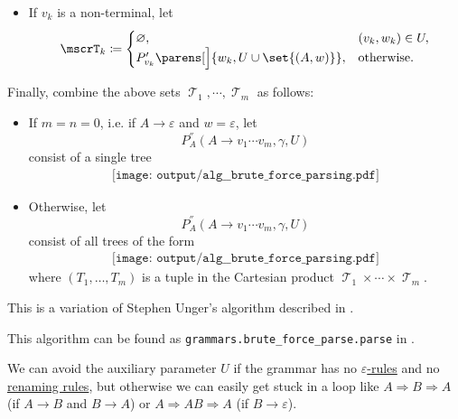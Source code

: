 \begin{algorithm}
\begin{thmenum}
\begin{itemize}
      \item If \( v_k \) is a non-terminal, let
      \begin{equation*}
        \mscrT_k \coloneqq \begin{cases}
          \varnothing,                                         &(v_k, w_k) \in U, \\
          P'_{v_k}\parens[\Big]{ w_k, U \cup \set{ (A, w) } }, &\T{otherwise.}
        \end{cases}
      \end{equation*}
    \end{itemize}

     Finally, combine the above sets \( \mscrT_1, \cdots, \mscrT_m \) as follows:
    \begin{itemize}
      \item If \( m = n = 0 \), i.e. if \( A \to \varepsilon \) and \( w = \varepsilon \), let
      \begin{equation*}
        P^\dprime_A(A \to v_1 \cdots v_m, \gamma, U)
      \end{equation*}
      consist of a single tree
      \begin{equation*}
        \begin{aligned}
          \texttt{[image: output/alg\_\_brute\_force\_parsing.pdf]}
        \end{aligned}
      \end{equation*}

      \item Otherwise, let
      \begin{equation*}
        P^\dprime_A(A \to v_1 \cdots v_m, \gamma, U)
      \end{equation*}
      consist of all trees of the form
      \begin{equation*}
        \begin{aligned}
          \texttt{[image: output/alg\_\_brute\_force\_parsing.pdf]}
        \end{aligned}
      \end{equation*}
      where \( (T_1, \ldots, T_m) \) is a tuple in the Cartesian product \( \mscrT_1 \times \cdots \times \mscrT_m \).
    \end{itemize}
  \end{thmenum}
\end{algorithm}
\begin{comments}
  \item This is a variation of Stephen Unger's algorithm described in \cite{Unger1968}.
  \item This algorithm can be found as \texttt{grammars.brute\_force\_parse.parse} in \cite{code}.
  \item We can avoid the auxiliary parameter \( U \) if the grammar has no \hyperref[def:epsilon_free_grammar]{\( \varepsilon \)-rules} and no \hyperref[alg:rewriting_rule_collapse]{renaming rules}, but otherwise we can easily get stuck in a loop like \( A \Rightarrow B \Rightarrow A \) (if \( A \to B \) and \( B \to A \)) or \( A \Rightarrow AB \Rightarrow A \) (if \( B \to \varepsilon \)).
\end{comments}

